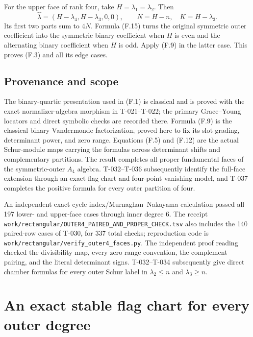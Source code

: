 \documentclass[
  10pt,
]{article}
\begin{document}
For the upper face of rank four, take \(H=\lambda_1=\lambda_2\). Then \[
\widehat\lambda=(H-\lambda_4,H-\lambda_3,0,0),
\qquad N=H-n,\quad K=H-\lambda_3.
\] Its first two parts sum to \(4N\). Formula (F.15) turns the original
symmetric outer coefficient into the symmetric binary coefficient when
\(H\) is even and the alternating binary coefficient when \(H\) is odd.
Apply (F.9) in the latter case. This proves (F.3) and all its edge
cases.

\subsection{Provenance and scope}\label{provenance-and-scope-1}

The binary-quartic presentation used in (F.1) is classical and is proved
with the exact normalizer-algebra morphism in T-021--T-022; the primary
Grace--Young locators and direct symbolic checks are recorded there.
Formula (F.9) is the classical binary Vandermonde factorization, proved
here to fix its slot grading, determinant power, and zero range.
Equations (F.5) and (F.12) are the actual Schur-module maps carrying the
formulas across determinant shifts and complementary partitions. The
result completes all proper fundamental faces of the symmetric-outer
\(A_4\) algebra. T-032--T-036 subsequently identify the full-face
extension through an exact flag chart and four-point vanishing model,
and T-037 completes the positive formula for every outer partition of
four.

An independent exact cycle-index/Murnaghan--Nakayama calculation passed
all 197 lower- and upper-face cases through inner degree 6. The receipt
\texttt{\small work/\allowbreak{}rectangular/\allowbreak{}OUTER4\_\allowbreak{}PAIRED\_\allowbreak{}AND\_\allowbreak{}PROPER\_\allowbreak{}CHECK.tsv}
also includes the 140 paired-row cases of T-030, for 337 total checks;
reproduction code is
\texttt{\small work/\allowbreak{}rectangular/\allowbreak{}verify\_\allowbreak{}outer4\_\allowbreak{}faces.py}.
The independent proof reading checked the divisibility map, every
zero-range convention, the complement pairing, and the literal
determinant signs. T-032--T-034 subsequently give direct chamber
formulas for every outer Schur label in \(\lambda_2\le n\) and
\(\lambda_3\ge n\).

\section{An exact stable flag chart for every outer
degree}\label{an-exact-stable-flag-chart-for-every-outer-degree}
\end{document}
